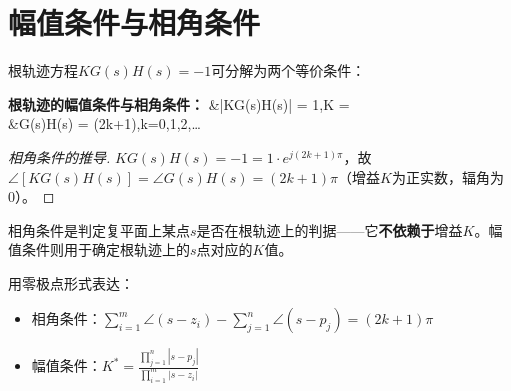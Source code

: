 \section{幅值条件与相角条件}

根轨迹方程$KG(s)H(s) = -1$可分解为两个等价条件：

\begin{myformula}
\textbf{根轨迹的幅值条件与相角条件：}
&\quad |KG(s)H(s)| = 1,\quad{}\quad K =  \\
&\quad \angle G(s)H(s) = \pm (2k+1)\pi,\quad k=0,1,2,\dots
\end{myformula}

\begin{proof}[相角条件的推导]
$KG(s)H(s) = -1 = 1 \cdot e^{j(2k+1)\pi}$，故$\angle [KG(s)H(s)] = \angle G(s)H(s) = (2k+1)\pi$（增益$K$为正实数，辐角为0）。
\end{proof}

相角条件是判定复平面上某点$s$是否在根轨迹上的判据——它\textbf{不依赖于}增益$K$。幅值条件则用于确定根轨迹上的$s$点对应的$K$值。

用零极点形式表达：
\begin{itemize}
\item 相角条件：$\sum_{i=1}^{m} \angle(s - z_i) - \sum_{j=1}^{n} \angle(s - p_j) = (2k+1)\pi$
\item 幅值条件：$K^* = \frac{\prod_{j=1}^{n} |s - p_j|}{\prod_{i=1}^{m} |s - z_i|}$
\end{itemize}

